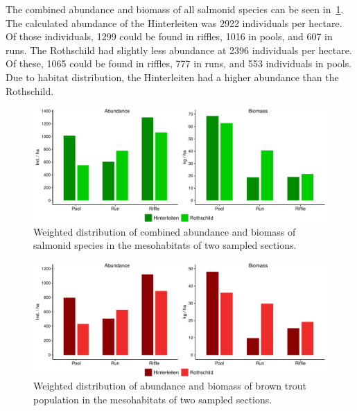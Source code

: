 The combined abundance and biomass of all salmonid species can be seen in~\cref{fig:AB_all_species}.
The calculated abundance of the Hinterleiten was 2922 individuals per hectare.
Of those individuals, 1299 could be found in riffles, 1016 in pools, and 607 in runs.
The Rothschild had slightly less abundance at 2396 individuals per hectare.
Of these, 1065 could be found in riffles, 777 in runs, and 553 individuals in pools.
Due to habitat distribution, the Hinterleiten had a higher abundance than the Rothschild.


\begin{figure}[!htb]                              %
	\center
	\includegraphics[width=.9\textwidth]{images/all_species.pdf}                %
	\caption{Weighted distribution of combined abundance and biomass of salmonid species in the mesohabitats of two sampled sections.}        %
	\label{fig:AB_all_species}                                                       %
\end{figure}

\begin{figure}[!htb]                              %
	\center
	\includegraphics[width=.9\textwidth]{images/brown_trout.pdf}                %
	\caption{Weighted distribution of abundance and biomass of brown trout population in the mesohabitats of two sampled sections.}        %
	\label{fig:AB_brown}                                                       %
\end{figure}

